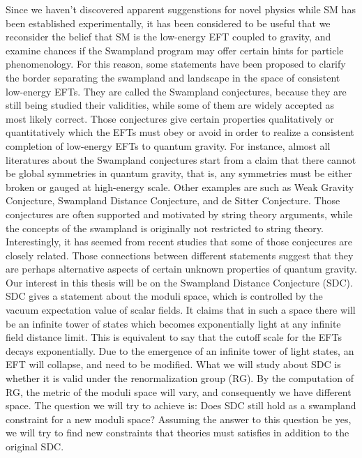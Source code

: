 \indent Since we haven't discovered apparent suggenstions for novel physics while SM has been established experimentally, it has been considered to be useful that we reconsider the belief that SM is the low-energy EFT coupled to gravity, and examine chances if the Swampland program may offer certain hints for particle phenomenology. For this reason, some statements have been proposed to clarify the border separating the swampland and landscape in the space of consistent low-energy EFTs. They are called the Swampland conjectures, because they are still being studied their validities, while some of them are widely accepted as most likely correct. Those conjectures give certain properties qualitatively or quantitatively which the EFTs must obey or avoid in order to realize a consistent completion of low-energy EFTs to quantum gravity. For instance, almost all literatures about the Swampland conjectures start from a claim that there cannot be global symmetries in quantum gravity, that is, any symmetries must be either broken or gauged at high-energy scale. Other examples are such as Weak Gravity Conjecture, Swampland Distance Conjecture, and de Sitter Conjecture. Those conjectures are often supported and motivated  by string theory arguments, while the concepts of the swampland is originally not restricted to string theory. Interestingly, it has seemed from recent studies that some of those conjecures are closely related. Those connections between different statements suggest that they are perhaps alternative aspects of certain unknown properties of quantum gravity. \\
\indent Our interest in this thesis will be on the Swampland Distance Conjecture (SDC). SDC gives a statement about the moduli space, which is controlled by the vacuum expectation value of scalar fields. It claims that in such a space there will be an infinite tower of states which becomes exponentially light at any infinite field distance limit. This is equivalent to say that the cutoff scale for the EFTs decays exponentially. Due to the emergence of an infinite tower of light states, an EFT will collapse, and need to be modified. What we will study about SDC is whether it is valid under the renormalization group (RG). By the computation of RG, the metric of the moduli space will vary, and consequently we have different space. The question we will try to achieve is: Does SDC still hold as a swampland constraint for a new moduli space? Assuming the answer to this question be yes, we will try to find new constraints that theories must satisfies in addition to the original SDC. \\
